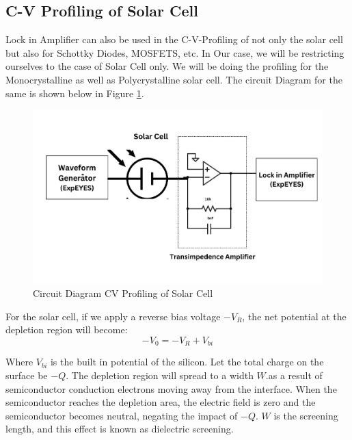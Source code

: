 \documentclass{article}
\begin{document}
\begin{multicols}{2}
\subsection{C-V Profiling of Solar Cell}

Lock in Amplifier can also be used in the C-V-Profiling of not only the solar cell but also for Schottky Diodes, MOSFETS, etc. In Our case, we will be restricting ourselves to the case of Solar Cell only. We will be doing the profiling for the Monocrystalline as well as Polycrystalline solar cell.  The circuit Diagram for the same is shown below in Figure \ref{circuit_1_CV}.

\begin{figure}[H]
    \centering
    \includegraphics[width=\columnwidth]{Images/CV_1.png}
    \caption{Circuit Diagram CV Profiling of Solar Cell}
    \label{circuit_1_CV}
\end{figure}



For the solar cell, if we apply a reverse bias voltage $-V_R$, the net potential at the depletion region will become:
\begin{equation}
    -V_0 = -V_R + V_{bi}
\end{equation}



Where $V_{bi}$ is the built in potential of the silicon. Let the total charge on the surface be $-Q$. The depletion region will spread to a width $W$.as a result of semiconductor conduction electrons moving away from the interface. When the semiconductor reaches the depletion area, the electric field is zero and the semiconductor becomes neutral, negating the impact of $-Q$. $W$ is the screening length, and this effect is known as dielectric screening.



\end{multicols}
\end{document}
